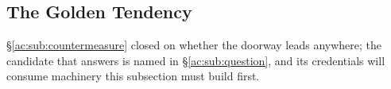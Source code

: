 \documentclass[11pt]{article}
\numberwithin{equation}{section}
\theoremstyle{plain}
\theoremstyle{definition}
\theoremstyle{remark}
\newcommand{\E}{\mathbb{E}}
\begin{document}
%

\subsection{The Golden Tendency}\label{ac:sub:tendency}

\S\ref{ac:sub:countermeasure} closed on whether the doorway leads anywhere; the candidate that answers is named in \S\ref{ac:sub:question}, and its credentials will consume machinery this subsection must build first.
\end{document}
